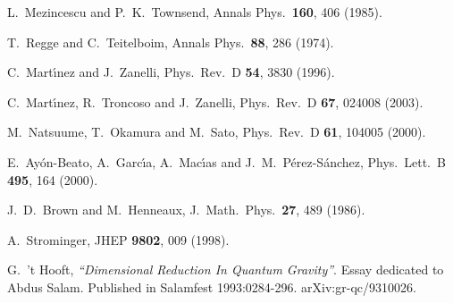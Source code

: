 \documentclass[a4paper,12pt]{article}
\begin{document}
\begin{thebibliography}{99}

  L.~Mezincescu and P.~K.~Townsend, 
Annals Phys.\ \textbf{160}, 406 (1985). 


  T.~Regge and C.~Teitelboim, 
Annals Phys.\ \textbf{88}, 286 (1974). 


  C.~Mart\'{\i }nez and J.~Zanelli, 
Phys.\ Rev.\ D \textbf{54}, 3830 (1996). 


  C.~Mart\'{\i }nez, R.~Troncoso and J.~Zanelli, 
Phys.\ Rev.\ D {\bf 67}, 024008 (2003).


  M.~Natsuume, T.~Okamura and M.~Sato, 
Phys.\ Rev.\ D \textbf{61}, 104005 (2000). 


  E.~Ay\'on-Beato, A.~Garc\'{\i }a, A.~Mac\'{\i }as and
J.~M.~P\'erez-S\'anchez, 
Phys.\ Lett.\ B \textbf{495}, 164 (2000). 

  J.~D.~Brown and M.~Henneaux, 
J.\ Math.\ Phys.\ \textbf{27}, 489 (1986). 


  A.~Strominger, 
JHEP \textbf{9802}, 009 (1998). 


  G.~'t Hooft, 
{\it ``Dimensional Reduction In Quantum Gravity''}.
Essay dedicated to Abdus Salam. 
Published in Salamfest 1993:0284-296. 
arXiv:gr-qc/9310026. 


\end{thebibliography}
\end{document}
